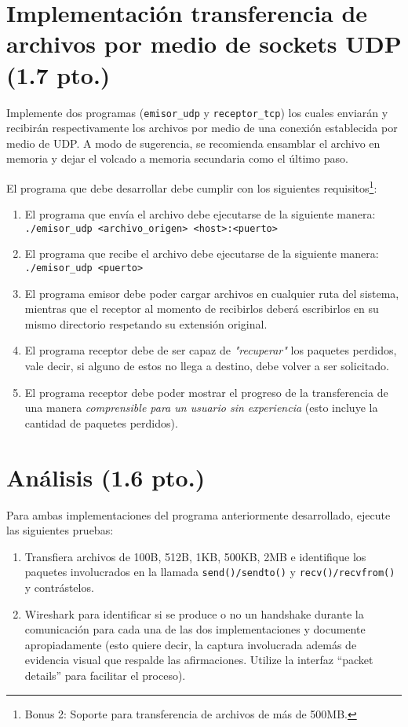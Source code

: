 \documentclass[11pt]{utalcaDoc}
\begin{document}
\section{Implementación transferencia de archivos por medio de sockets UDP (1.7 pto.)}
Implemente dos programas (\texttt{emisor_udp} y \texttt{receptor_tcp}) los cuales enviarán y recibirán respectivamente los archivos por medio de una conexión establecida por medio de UDP. A modo de sugerencia, se recomienda ensamblar el archivo en memoria y dejar el volcado a memoria secundaria como el último paso.

El programa que debe desarrollar debe cumplir con los siguientes requisitos\footnote{ Bonus 2: Soporte para transferencia de archivos de más de 500MB. }:
\begin{enumerate}
    \item{ El programa que envía el archivo debe ejecutarse de la siguiente manera:\\ \texttt{./emisor_udp <archivo_origen> <host>:<puerto>}}

    \item{ El programa que recibe el archivo debe ejecutarse de la siguiente manera:\\ \texttt{./emisor_udp <puerto>}}

    \item{ El programa emisor debe poder cargar archivos en cualquier ruta del sistema, mientras que el receptor al momento de recibirlos deberá escribirlos en su mismo directorio respetando su extensión original. }


    \item{ El programa receptor debe de ser capaz de \textit{"recuperar"} los paquetes perdidos, vale decir, si alguno de estos no llega a destino, debe volver a ser solicitado. }

    \item{ El programa receptor debe poder mostrar el progreso de la transferencia de una manera \textit{comprensible para un usuario sin experiencia} (esto incluye la cantidad de paquetes perdidos). }

\end{enumerate}

\section{Análisis (1.6 pto.)}
Para ambas implementaciones del programa anteriormente desarrollado, ejecute las siguientes pruebas:
\begin{enumerate}
    \item{ Transfiera archivos de 100B, 512B, 1KB, 500KB, 2MB e identifique los paquetes involucrados en la llamada \texttt{send()/sendto()} y \texttt{recv()/recvfrom()} y contrástelos.}

    \item{ Wireshark para identificar si se produce o no un handshake durante la comunicación para cada una de las dos implementaciones y documente apropiadamente (esto quiere decir, la captura involucrada además de evidencia visual que respalde las afirmaciones. Utilize la interfaz ``packet details'' para facilitar el proceso).}
\end{enumerate}
\end{document}
